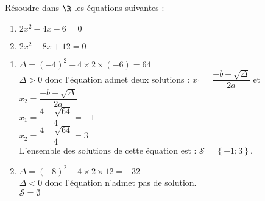 \documentclass[a4paper,11pt,exos]{nsi} %
\begin{document}



\maketitle

\begin{exercice}
    Résoudre dans $\R$ les équations suivantes :
    \begin{multicols}{2}
        \begin{enumerate}
            \item $2x^2-4x-6=0$
	        \item $2x^2-8x+12=0$
        \end{enumerate}
    \end{multicols}
    
\end{exercice}

\begin{enumerate}
    \item $\Delta = (-4)^2-4\times2\times(-6)=64$\\$\Delta>0$ donc l'équation admet deux solutions : $x_1 = \dfrac{-b-\sqrt{\Delta}}{2a}$ et $x_2 = \dfrac{-b+\sqrt{\Delta}}{2a}$\\$x_1 =\dfrac{4-\sqrt{64}}{4}=-1$\\$x_2 =\dfrac{4+\sqrt{64}}{4}=3$\\L'ensemble des solutions de cette équation est : $\mathcal{S}=\left\{-1 ; 3\right\}$.
\item $\Delta = (-8)^2-4\times2\times12=-32$\\$\Delta<0$ donc l'équation n'admet pas de solution.\\$\mathcal{S}=\emptyset$
\end{enumerate}
\end{document}
